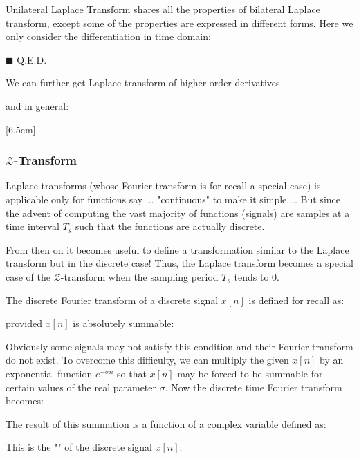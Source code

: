 	\label{properties of unilateral Laplace Transform}Unilateral Laplace Transform shares all the properties of bilateral Laplace transform, except some of the properties are expressed in different forms. Here we only consider the differentiation in time domain:
	
	\begin{dem}
	
	\begin{flushright}
		$\blacksquare$  Q.E.D.
	\end{flushright}
	\end{dem}
	We can further get Laplace transform of higher order derivatives
	
	and in general:
	

	[6.5cm]
	
	\pagebreak
	\subsubsection{$\mathcal{Z}$-Transform}
	Laplace transforms (whose Fourier transform is for recall a special case) is applicable only for functions say ... "continuous" to make it simple.... But since the advent of computing the vast majority of functions (signals) are samples at a time interval $T_s$ such that the functions are actually discrete.

	From then on it becomes useful to define a transformation similar to the Laplace transform but in the discrete case! Thus, the Laplace transform becomes a special case of the $\mathcal{Z}$-transform when the sampling period $T_s$ tends to $0$.

	The discrete Fourier transform of a discrete signal $x[n]$ is defined for recall as:
	
	provided $x[n]$ is absolutely summable:
	
	Obviously some signals may not satisfy this condition and their Fourier transform do not exist. To overcome this difficulty, we can multiply the given $x[n]$ by an exponential function $e^{-\sigma n}$ so that $x[n]$ may be forced to be summable for certain values of the real parameter $\sigma$. Now the discrete time Fourier transform becomes:
	
	The result of this summation is a function of a complex variable defined as:
	
	This is the "" of the discrete signal $x[n]$:
	
